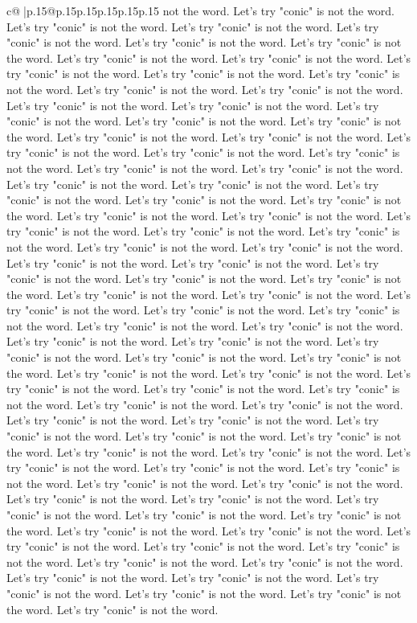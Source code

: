 \documentclass{article}
\begin{document}
{\begin{supertabular}{c@{$\;$}|p{.15\linewidth}@{}p{.15\linewidth}p{.15\linewidth}p{.15\linewidth}p{.15\linewidth}p{.15\linewidth}}
{{{not the word. Let's try "conic" is not the word. Let's try "conic" is not the word. Let's try "conic" is not the word. Let's try "conic" is not the word. Let's try "conic" is not the word. Let's try "conic" is not the word. Let's try "conic" is not the word. Let's try "conic" is not the word. Let's try "conic" is not the word. Let's try "conic" is not the word. Let's try "conic" is not the word. Let's try "conic" is not the word. Let's try "conic" is not the word. Let's try "conic" is not the word. Let's try "conic" is not the word. Let's try "conic" is not the word. Let's try "conic" is not the word. Let's try "conic" is not the word. Let's try "conic" is not the word. Let's try "conic" is not the word. Let's try "conic" is not the word. Let's try "conic" is not the word. Let's try "conic" is not the word. Let's try "conic" is not the word. Let's try "conic" is not the word. Let's try "conic" is not the word. Let's try "conic" is not the word. Let's try "conic" is not the word. Let's try "conic" is not the word. Let's try "conic" is not the word. Let's try "conic" is not the word. Let's try "conic" is not the word. Let's try "conic" is not the word. Let's try "conic" is not the word. Let's try "conic" is not the word. Let's try "conic" is not the word. Let's try "conic" is not the word. Let's try "conic" is not the word. Let's try "conic" is not the word. Let's try "conic" is not the word. Let's try "conic" is not the word. Let's try "conic" is not the word. Let's try "conic" is not the word. Let's try "conic" is not the word. Let's try "conic" is not the word. Let's try "conic" is not the word. Let's try "conic" is not the word. Let's try "conic" is not the word. Let's try "conic" is not the word. Let's try "conic" is not the word. Let's try "conic" is not the word. Let's try "conic" is not the word. Let's try "conic" is not the word. Let's try "conic" is not the word. Let's try "conic" is not the word. Let's try "conic" is not the word. Let's try "conic" is not the word. Let's try "conic" is not the word. Let's try "conic" is not the word. Let's try "conic" is not the word. Let's try "conic" is not the word. Let's try "conic" is not the word. Let's try "conic" is not the word. Let's try "conic" is not the word. Let's try "conic" is not the word. Let's try "conic" is not the word. Let's try "conic" is not the word. Let's try "conic" is not the word. Let's try "conic" is not the word. Let's try "conic" is not the word. Let's try "conic" is not the word. Let's try "conic" is not the word. Let's try "conic" is not the word. Let's try "conic" is not the word. Let's try "conic" is not the word. Let's try "conic" is not the word. Let's try "conic" is not the word. Let's try "conic" is not the word. Let's try "conic" is not the word. Let's try "conic" is not the word. Let's try "conic" is not the word. Let's try "conic" is not the word. Let's try "conic" is not the word. Let's try "conic" is not the word. Let's try "conic" is not the word. Let's try "conic" is not the word. Let's try "conic" is not the word. Let's try "conic" is not the word. Let's try "conic" is not the word. Let's try "conic" is not the word. Let's try "conic" is not the word. }}}
\end{supertabular}}
\end{document}
